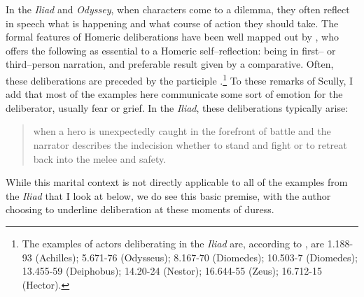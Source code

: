 \documentclass[12pt,letterpaper,oneside,final]{memoir}
\begin{document}
In the \emph{Iliad} and \emph{Odyssey}, when characters come to a dilemma, they often reflect in speech what is happening and what course of action they should take. The formal features of Homeric deliberations have been well mapped out by \textcite[11]{scully1984}, who offers the following as essential to a Homeric self--reflection: being in first-- or third--person narration,  and preferable result given by a comparative. Often, these deliberations are preceded by the participle .\footnote{The examples of actors deliberating in the \emph{Iliad} are, according to \textcite[p.~12, nn. 1]{scully1984}, are 1.188-93 (Achilles); 5.671-76 (Odysseus); 8.167-70 (Diomedes); 10.503-7 (Diomedes); 13.455-59 (Deiphobus); 14.20-24 (Nestor); 16.644-55 (Zeus); 16.712-15 (Hector).} To these remarks of Scully, I add that most of the examples here communicate some sort of emotion for the deliberator, usually fear or grief. In the \emph{Iliad}, these deliberations typically arise: \blockquote[{\cite[11]{scully1984}}]{when a hero is unexpectedly caught in the forefront of battle and the narrator describes the indecision whether to stand and fight or to retreat back into the melee and safety.} While this marital context is  not directly applicable to all of the examples from the \emph{Iliad} that I look at below, we do see this basic premise, with the author choosing to underline deliberation at these moments of duress.
\end{document}
